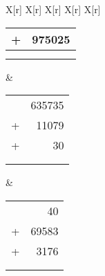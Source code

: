 \documentclass{article}%
\begin{document}
\begin{longtabu}{X[r] X[r] X[r] X[r] X[r] }
\begin{tabular}{ c r }
+&975025\\%
\hline%
&\\%
&\\%
\end{tabular}&\renewcommand{\arraystretch}{1.2}%
\begin{tabular}{ c r }%
&635735\\%
+&11079\\%
+&30\\%
\hline%
&\\%
&\\%
\end{tabular}&\renewcommand{\arraystretch}{1.2}%
\begin{tabular}{ c r }%
&40\\%
+&69583\\%
+&3176\\%
\hline%
&\\%
&\\%
\end{tabular}\\%
\end{longtabu}%
\end{document}
